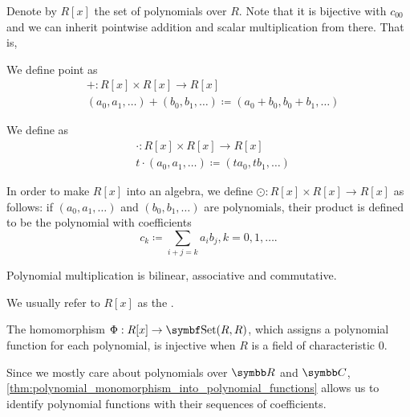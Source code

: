 \begin{definition}\label{def:algebra_of_polynomials}
  Denote by \( R[x] \) the set of polynomials over \( R \). Note that it is bijective with \( c_{00} \) and we can inherit pointwise addition and scalar multiplication from there. That is,

  \begin{defenum}
     We define  point as
    \begin{align*}
      &+: R[x] \times R[x] \to R[x] \\
      &(a_0, a_1, \ldots) + (b_0, b_1, \ldots) \coloneqq (a_0 + b_0, b_0 + b_1, \ldots)
    \end{align*}

     We define  as
    \begin{align*}
      &\cdot: R[x] \times R[x] \to R[x] \\
      &t \cdot (a_0, a_1, \ldots) \coloneqq (t a_0, t b_1, \ldots)
    \end{align*}

     In order to make \( R[x] \) into an algebra, we define  \( \odot: R[x] \times R[x] \to R[x] \) as follows: if \( (a_0, a_1, \ldots) \) and \( (b_0, b_1, \ldots) \) are polynomials, their product is defined to be the polynomial with coefficients
    \begin{equation}
      c_k \coloneqq \sum_{i+j=k} a_i b_j, k = 0, 1, \ldots.
    \end{equation}

    Polynomial multiplication is bilinear, associative and commutative.
  \end{defenum}

  We usually refer to \( R[x] \) as the .
\end{definition}

\begin{theorem}\label{thm:polynomial_monomorphism_into_polynomial_functions}
  The homomorphism \( \Phi: R[x] \to \Cat{Set}(R, R) \), which assigns a polynomial function for each polynomial, is injective when \( R \) is a field of characteristic \( 0 \).
\end{theorem}

\begin{remark}\label{remark:polynomial_vs_polynomial_function}
  Since we mostly care about polynomials over \( \R \) and \( \Co \), \cref{thm:polynomial_monomorphism_into_polynomial_functions} allows us to identify polynomial functions with their sequences of coefficients.
\end{remark}
